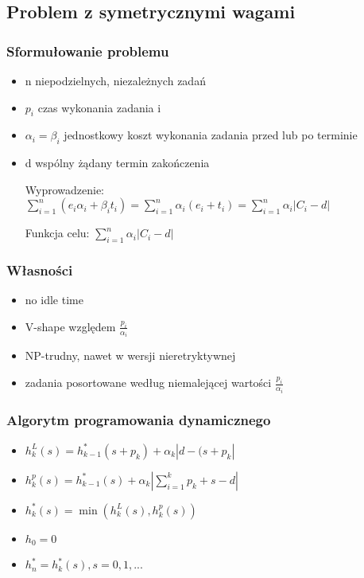 \documentclass[12pt,a4paper]{article}
\begin{document}
\subsection{Problem z symetrycznymi wagami}
\subsubsection{Sformułowanie problemu}
\begin{itemize}
\item n niepodzielnych, niezależnych zadań
\item $p_{i}$ czas wykonania zadania i
\item $\alpha_{i} =\beta_{i}$ jednostkowy koszt wykonania zadania przed lub po terminie
\item d wspólny żądany termin zakończenia

Wyprowadzenie: $\sum\limits_{i=1}^{n}(e_{i}\alpha_{i}+\beta_{i}t_{i}) = \sum\limits_{i=1}^{n}\alpha_{i}(e_{i}+t_{i}) = \sum\limits_{i=1}^{n}\alpha_{i}\left | C_{i} - d \right |$

Funkcja celu: $\sum\limits_{i=1}^{n}\alpha_{i}\left | C_{i} - d \right |$
\end{itemize}
\subsubsection{Własności}
\begin{itemize}
\item no idle time
\item V-shape względem $\frac{p_{i}}{\alpha_{i}}$
\item NP-trudny, nawet w wersji nieretryktywnej
\item zadania posortowane według niemalejącej wartości $\frac{p_{i}}{\alpha_{i}}$
\end{itemize}
\subsubsection{Algorytm programowania dynamicznego}
\begin{itemize}
\item $h_{k}^{L}(s) = h_{k-1}^{*}(s+p_{k}) + \alpha_{k} \left | d-(s+p_{k} \right |$
\item $h_{k}^{p}(s) = h_{k-1}^{*}(s) + \alpha_{k} \left | \sum\limits_{i=1}^{k} p_{k}+s-d \right |$
\item $h_{k}^{*}(s)=\min(h_{k}^{L}(s), h_{k}^{p}(s))$
\item $h_{0}=0$
\item $h_{n}^{*} = {h_{k}^{*}(s), s=0,1,...}$
\end{itemize}
\end{document}
